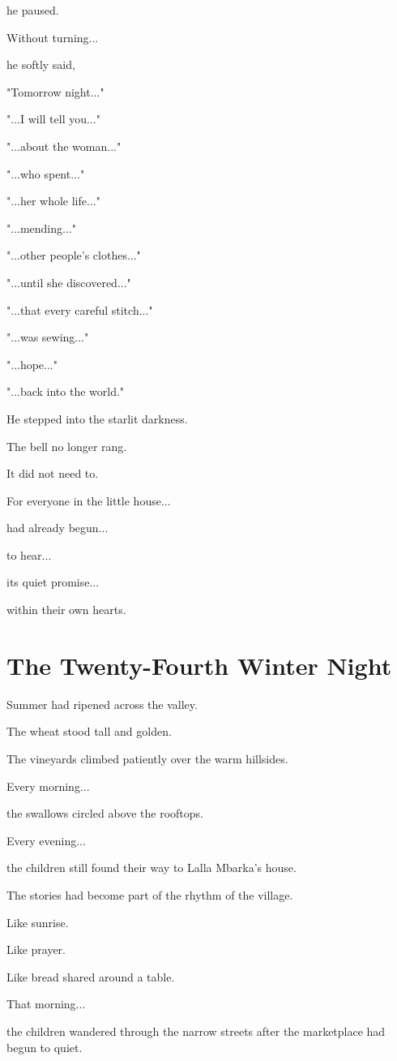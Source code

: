 \documentclass[12pt,openany]{book}
\begin{document}
he paused.

Without turning...

he softly said,

"Tomorrow night..."

"...I will tell you..."

"...about the woman..."

"...who spent..."

"...her whole life..."

"...mending..."

"...other people's clothes..."

"...until she discovered..."

"...that every careful stitch..."

"...was sewing..."

"...hope..."

"...back into the world."

He stepped into the starlit darkness.

The bell no longer rang.

It did not need to.

For everyone in the little house...

had already begun...

to hear...

its quiet promise...

within their own hearts.
\chapter{The Twenty-Fourth Winter Night}

Summer had ripened across the valley.

The wheat stood tall and golden.

The vineyards climbed patiently over the warm hillsides.

Every morning...

the swallows circled above the rooftops.

Every evening...

the children still found their way to Lalla Mbarka's house.

The stories had become part of the rhythm of the village.

Like sunrise.

Like prayer.

Like bread shared around a table.

That morning...

the children wandered through the narrow streets after the marketplace had begun to quiet.
\end{document}
